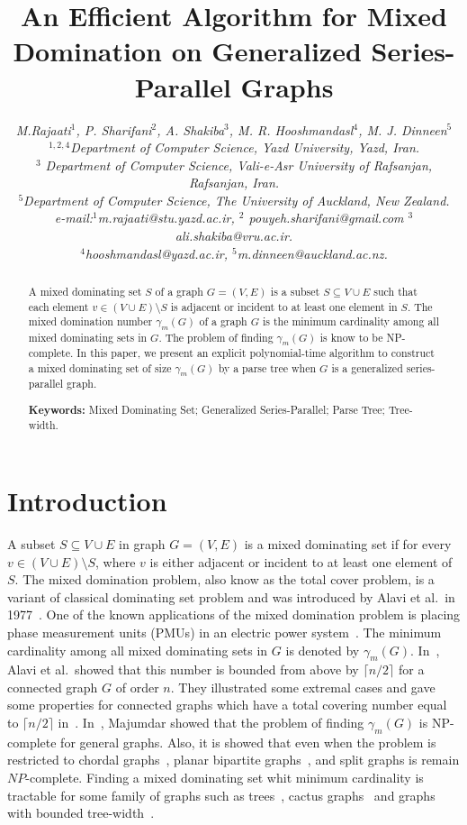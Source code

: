 \documentclass[12pt]{article}
\title{An Efficient Algorithm for Mixed Domination on Generalized Series-Parallel Graphs}
\author{\small\it  M.Rajaati$^1$, P. Sharifani$^{2}$, A. Shakiba$^{3}$, M. R. Hooshmandasl$^{4}$, M. J. Dinneen$^{5}$   \\
	\footnotesize{$^{1,2,4}$Department of Computer Science, Yazd University, Yazd, Iran. }  \\
	\footnotesize{$^{3}$ Department of Computer Science, Vali-e-Asr University of Rafsanjan, Rafsanjan, Iran.}\\
	\footnotesize{$^{5}$Department of Computer Science, The University of Auckland, New Zealand.}\\
	\footnotesize{e-mail:$^1$m.rajaati@stu.yazd.ac.ir, $^2$ pouyeh.sharifani@gmail.com $^3$ali.shakiba@vru.ac.ir.}\\
 \footnotesize{$^4$hooshmandasl@yazd.ac.ir, $^5$m.dinneen@auckland.ac.nz.}
}
\date{}
\theoremstyle{definition}
\theoremstyle{remark}
\begin{document}
	\maketitle
	
	\begin{abstract}
		A mixed dominating set $S$ of a graph $G=(V,E)$ is a subset $ S \subseteq V \cup E$ such that each element $v\in (V \cup E) \setminus S$ is adjacent or incident to  at least one element in $S$.
		The mixed domination number $\gamma_m(G)$ of a graph $G$ is the minimum cardinality among all mixed dominating sets in $G$.
		The problem of finding $\gamma_{m}(G)$ is know to be  NP-complete. In
this paper, we present an explicit polynomial-time algorithm to construct a mixed
dominating set of size $\gamma_{m}(G)$ by a parse tree when $G$ is a generalized series-parallel graph.
	  

\noindent\textbf{Keywords:} Mixed Dominating Set; Generalized Series-Parallel; Parse Tree; Tree-width. 


	\end{abstract}

\section{Introduction}
A subset $S \subseteq V \cup E$ in graph $G=(V,E)$ is a mixed dominating set if for every $v\in (V \cup E) \setminus S$, where $v$ is either adjacent or incident to at least one element of $S$.
The mixed domination problem, also know as the total cover problem, is a variant of
classical dominating set problem and was introduced by Alavi et al.~in 1977~\cite{alavi1977total}.  
One of the known applications of the mixed domination problem is placing phase
measurement units (PMUs) in an electric power system~\cite{zhao2011algorithmic}. 
The minimum cardinality among all mixed dominating sets in $G$ is denoted by $\gamma_m(G)$.   
In~\cite{alavi1977total}, Alavi et al.~showed that this number is bounded from above by $\lceil n/2 \rceil$ for a connected graph $G$ of order $n$. They illustrated some extremal cases and gave some properties for connected graphs which have a total covering number equal to $\lceil n/2 \rceil$ in~\cite{alavi1992total}.
In~\cite{majumdar1992neighborhood}, Majumdar showed that the problem of finding $\gamma_m(G)$  is NP-complete  for general  graphs.
 Also, it is showed that even when the problem is restricted to chordal
graphs~\cite{hedetniemi1995domination}, planar bipartite graphs~\cite{manlove1999algorithmic},  and split graphs\cite{lan2013mixed, zhao2011algorithmic} is remain $NP$-complete. 
Finding a mixed dominating set whit minimum cardinality is tractable for some family of
graphs such as trees~\cite{adhar1994mixed,zhao2011algorithmic,lan2013mixed}, cactus
graphs~\cite{lan2013mixed} and graphs with bounded tree-width~\cite{rajaati2016fixed}.    
\end{document}
